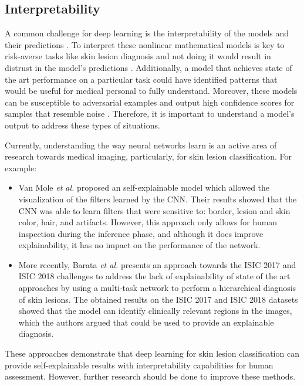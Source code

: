     \subsection{Interpretability}
    A common challenge for deep learning is the interpretability of the models and their predictions \cite{Ching2018}. To interpret these nonlinear mathematical models is key to risk-averse tasks like skin lesion diagnosis and not doing it would result in distrust in the model's predictions \cite{Ching2018}. Additionally, a model that achieves state of the art performance on a particular task could have identified patterns that would be useful for medical personal to fully understand. Moreover, these models can be susceptible to adversarial examples and output high confidence scores for samples that resemble noise \cite{Ching2018}. Therefore, it is important to understand a model’s output to address these types of situations.  \par
    
    Currently, understanding the way neural networks learn is an active area of research towards medical imaging, particularly, for skin lesion classification. For example:
    \begin{itemize}
        \item Van Mole \textit{et al.} \cite{VanMolle2018} proposed an self-explainable model which allowed the visualization of the filters learned by the \ac{CNN}. Their results showed that the CNN was able to learn filters that were sensitive to: border, lesion and skin color, hair, and artifacts. However, this approach only allows for human inspection during the inference phase, and although it does improve explainability, it has no impact on the performance of the network.
        \item More recently, Barata \textit{et al.} \cite{Barata2020} presents an approach towards the \ac{ISIC} 2017 and \ac{ISIC} 2018 challenges to address the lack of explainability of state of the art approaches by using a multi-task network to perform a hierarchical diagnosis of skin lesions. The obtained results on the \ac{ISIC} 2017 and \ac{ISIC} 2018 datasets showed that the model can identify clinically relevant regions in the images, which the authors argued that could be used to provide an explainable diagnosis.
    \end{itemize}
     These approaches demonstrate that deep learning for skin lesion classification can provide self-explainable results with interpretability capabilities for human assessment. However, further research should be done to improve these methods. \par 
    
